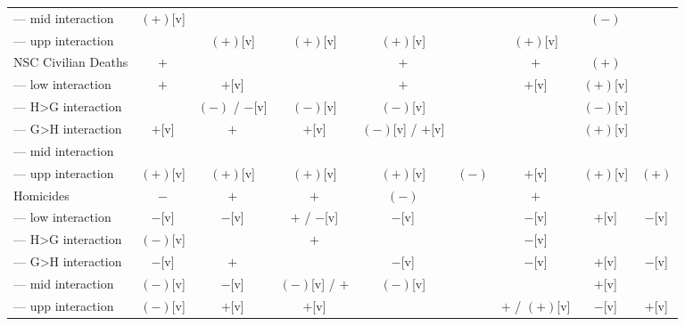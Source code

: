 \begin{landscape}
\begin{table}[!htbp]
\begin{tabular}{lcccccccc}
--- mid interaction & $(+)$[v]   &                &                &                   &          &                & $(-)$         & \\
--- upp interaction &            & $(+)$[v]       & $(+)$[v]       & $(+)$[v]          &          & $(+)$[v]       &               & \\
NSC Civilian Deaths & $+$        &                &                & $+$               &          & $+$            & $(+)$         & \\
--- low interaction & $+$        & $+$[v]         &                & $+$               &          & $+$[v]         & $(+)$[v]      & \\
--- H>G interaction &            & $(-)$ / $-$[v] & $(-)$[v]       & $(-)$[v]          &          &                & $(-)$[v]      & \\
--- G>H interaction & $+$[v]     & $+$            & $+$[v]         & $(-)$[v] / $+$[v] &          &                & $(+)$[v]      & \\
--- mid interaction &            &                &                &                   &          &                &               & \\
--- upp interaction & $(+)$[v]   & $(+)$[v]       & $(+)$[v]       & $(+)$[v]          & $(-)$    & $+$[v]         & $(+)$[v]      & $(+)$ \\
Homicides           & $-$        & $+$            & $+$            & $(-)$             &          & $+$            &               & \\
--- low interaction & $-$[v]     & $-$[v]         & $+$ / $-$[v]   & $-$[v]            &          & $-$[v]         & $+$[v]        & $-$[v] \\
--- H>G interaction & $(-)$[v]   &                & $+$            &                   &          & $-$[v]         &               & \\
--- G>H interaction & $-$[v]     & $+$            &                & $-$[v]            &          & $-$[v]         & $+$[v]        & $-$[v] \\
--- mid interaction & $(-)$[v]   & $-$[v]         & $(-)$[v] / $+$ & $(-)$[v]          &          &                & $+$[v]        & \\
--- upp interaction & $(-)$[v]   & $+$[v]         & $+$[v]         &                   &          & $+$ / $(+)$[v] & $-$[v]        & $+$[v] \\
\bottomrule
\end{tabular}
\end{table}
\end{landscape}
